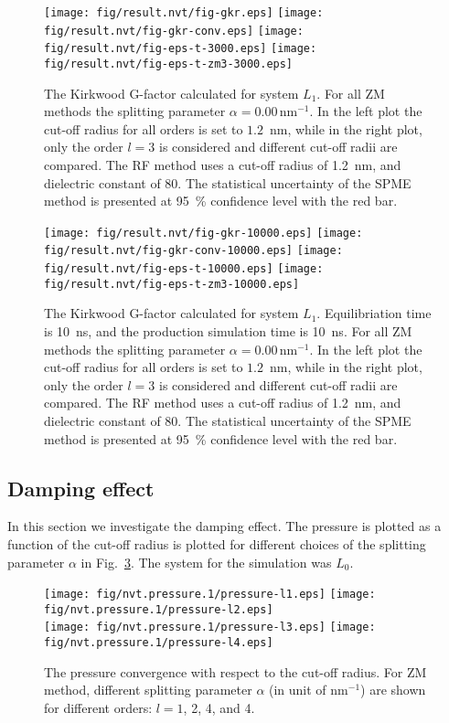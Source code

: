 \documentclass[aip,jcp,a4paper,preprint,unsortedaddress,onecolumn,fleqn]{revtex4-1}
\newcommand{\systemlb}{L_1}
\begin{document}
\begin{figure}
  \centering
  \texttt{[image: fig/result.nvt/fig-gkr.eps]}
  \texttt{[image: fig/result.nvt/fig-gkr-conv.eps]}
  \texttt{[image: fig/result.nvt/fig-eps-t-3000.eps]}
  \texttt{[image: fig/result.nvt/fig-eps-t-zm3-3000.eps]}
  \caption{The Kirkwood G-factor calculated for system $\systemlb$.
    For all ZM methods the splitting parameter $\alpha = 0.00\,\textrm{nm}^{-1}$.
    In the left plot the cut-off radius for all orders is set to $1.2$~nm, while
    in the right plot, only the order $l=3$ is considered and different cut-off radii are compared.
    The RF method uses a cut-off radius of 1.2~nm, and dielectric constant of 80.
    The statistical uncertainty of the SPME method is presented at 95~\% confidence level with the red bar.
  }
  \label{fig:tmp2}
\end{figure}

\begin{figure}
  \centering
  \texttt{[image: fig/result.nvt/fig-gkr-10000.eps]}
  \texttt{[image: fig/result.nvt/fig-gkr-conv-10000.eps]}
  \texttt{[image: fig/result.nvt/fig-eps-t-10000.eps]}
  \texttt{[image: fig/result.nvt/fig-eps-t-zm3-10000.eps]}
  \caption{The Kirkwood G-factor calculated for system $\systemlb$. Equilibriation time is 10~ns, and the production simulation time is 10~ns.
    For all ZM methods the splitting parameter $\alpha = 0.00\,\textrm{nm}^{-1}$.
    In the left plot the cut-off radius for all orders is set to $1.2$~nm, while
    in the right plot, only the order $l=3$ is considered and different cut-off radii are compared.
    The RF method uses a cut-off radius of 1.2~nm, and dielectric constant of 80.
    The statistical uncertainty of the SPME method is presented at 95~\% confidence level with the red bar.
  }
  \label{fig:tmp3}
\end{figure}






\subsection{Damping effect}

In this section we investigate the damping effect. The pressure is plotted as a function of  the cut-off radius is plotted for different choices of
the splitting parameter $\alpha$ in Fig.~\ref{fig:damp-pres}. The system for the simulation was $L_0$.
\begin{figure}
  \centering
  \texttt{[image: fig/nvt.pressure.1/pressure-l1.eps]}
  \texttt{[image: fig/nvt.pressure.1/pressure-l2.eps]}\\
  \texttt{[image: fig/nvt.pressure.1/pressure-l3.eps]}
  \texttt{[image: fig/nvt.pressure.1/pressure-l4.eps]}
  \caption{The pressure convergence with respect to the cut-off radius.
    For ZM method, different splitting parameter $\alpha$ (in unit of $\textrm{nm}^{-1}$) are shown for different orders:  $l=1$, 2, 4, and 4.
  }
  \label{fig:damp-pres}
\end{figure}
\end{document}

